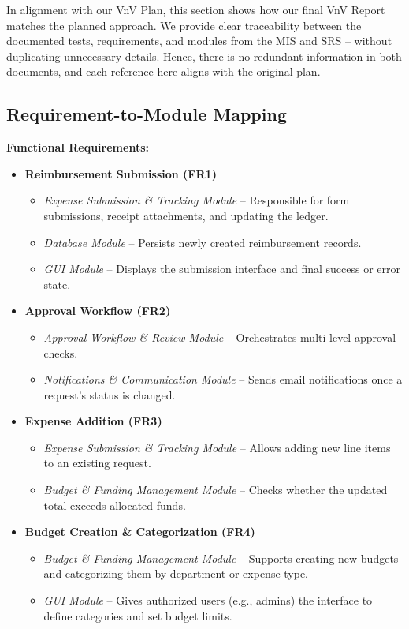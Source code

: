 \documentclass[12pt, titlepage]{article}
\begin{document}
In alignment with our VnV Plan, this section shows how our final VnV Report
matches the planned approach. We provide clear traceability between
the documented tests, requirements, and modules from the MIS and SRS –
without duplicating unnecessary details. Hence, there is no redundant
information in both documents, and each reference here aligns with the
original plan.

\subsection{Requirement-to-Module Mapping}

\textbf{Functional Requirements:}
\begin{itemize}
  \item \textbf{Reimbursement Submission (FR1)} 
    \begin{itemize}
      \item \emph{Expense Submission \& Tracking Module} – Responsible for form submissions, receipt attachments, and updating the ledger.
      \item \emph{Database Module} – Persists newly created reimbursement records.
      \item \emph{GUI Module} – Displays the submission interface and final success or error state.
    \end{itemize}

  \item \textbf{Approval Workflow (FR2)}
    \begin{itemize}
      \item \emph{Approval Workflow \& Review Module} – Orchestrates multi-level approval checks.
      \item \emph{Notifications \& Communication Module} – Sends email notifications once a request’s status is changed.
    \end{itemize}

  \item \textbf{Expense Addition (FR3)}
    \begin{itemize}
      \item \emph{Expense Submission \& Tracking Module} – Allows adding new line items to an existing request.
      \item \emph{Budget \& Funding Management Module} – Checks whether the updated total exceeds allocated funds.
    \end{itemize}

  \item \textbf{Budget Creation \& Categorization (FR4)}
    \begin{itemize}
      \item \emph{Budget \& Funding Management Module} – Supports creating new budgets and categorizing them by department or expense type.
      \item \emph{GUI Module} – Gives authorized users (e.g., admins) the interface to define categories and set budget limits.
    \end{itemize}


\end{itemize}
\end{document}
